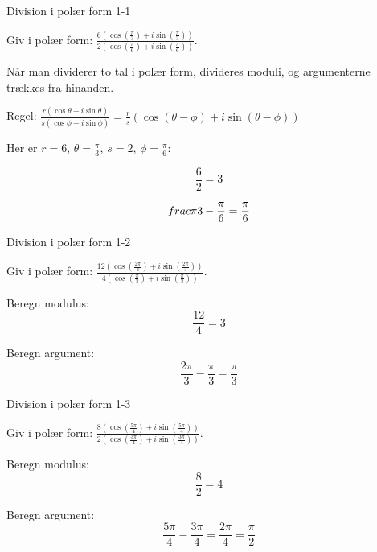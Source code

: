 \documentclass{article}
\begin{document}

\tableofcontents
\newpage

\begin{exercise}{Division i polær form 1-1}

Giv i polær form: $\frac{6(\cos(\frac{\pi}{3}) + i\sin(\frac{\pi}{3}))}{2(\cos(\frac{\pi}{6}) + i\sin(\frac{\pi}{6}))}$.


\hint

Når man dividerer to tal i polær form, divideres moduli, og argumenterne trækkes fra hinanden.

\hint

Regel: $\frac{r(\cos \theta + i \sin \theta)}{s(\cos \phi + i \sin \phi)} = \frac{r}{s} \left(\cos(\theta - \phi) + i \sin(\theta - \phi)\right)$

\hint

Her er $r = 6$, $\theta = \frac{\pi}{3}$, $s = 2$, $\phi = \frac{\pi}{6}$:

\hint
\[
 \frac{6}{2} = 3
\]

\hint
\[
 \\frac{\pi}{3} - \frac{\pi}{6} = \frac{\pi}{6}
\]

\end{exercise}

\newpage

\begin{exercise}{Division i polær form 1-2}

Giv i polær form: $\frac{12(\cos(\frac{2\pi}{3}) + i\sin(\frac{2\pi}{3}))}{4(\cos(\frac{\pi}{3}) + i\sin(\frac{\pi}{3}))}$.


\hint

Beregn modulus:
\[
\frac{12}{4} = 3
\]

\hint

Beregn argument:
\[
\frac{2\pi}{3} - \frac{\pi}{3} = \frac{\pi}{3}
\]

\end{exercise}

\newpage

\begin{exercise}{Division i polær form 1-3}

Giv i polær form: $\frac{8(\cos(\frac{5\pi}{4}) + i\sin(\frac{5\pi}{4}))}{2(\cos(\frac{3\pi}{4}) + i\sin(\frac{3\pi}{4}))}$.


\hint

Beregn modulus:
\[
\frac{8}{2} = 4
\]

\hint

Beregn argument:
\[
\frac{5\pi}{4} - \frac{3\pi}{4} = \frac{2\pi}{4} = \frac{\pi}{2}
\]

\end{exercise}
\end{document}
